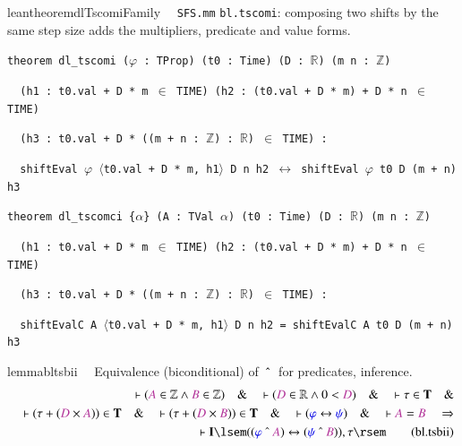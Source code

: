 \begin{restatable}{leantheorem}{dlTscomiFamily}~~ \texttt{SFS.mm} \texttt{bl.tscomi}: composing two shifts by the same step size adds the multipliers, predicate and value forms.

\texttt{\textcolor{leancolor}{theorem} \textcolor{leanyellow}{dl\_tscomi} ($\varphi$ : TProp) (t0 : Time) (D : $\mathbb{R}$) (m n : $\mathbb{Z}$)}

\texttt{~~(h1 : t0.val + D * m $\in$ TIME) (h2 : (t0.val + D * m) + D * n $\in$ TIME)}

\texttt{~~(h3 : t0.val + D * ((m + n : $\mathbb{Z}$) : $\mathbb{R}$) $\in$ TIME) :}

\texttt{~~shiftEval $\varphi$ $\langle$t0.val + D * m, h1$\rangle$ D n h2 $\leftrightarrow$ shiftEval $\varphi$ t0 D (m + n) h3}

\texttt{\textcolor{leancolor}{theorem} \textcolor{leanyellow}{dl\_tscomci} \{$\alpha$\} (A : TVal $\alpha$) (t0 : Time) (D : $\mathbb{R}$) (m n : $\mathbb{Z}$)}

\texttt{~~(h1 : t0.val + D * m $\in$ TIME) (h2 : (t0.val + D * m) + D * n $\in$ TIME)}

\texttt{~~(h3 : t0.val + D * ((m + n : $\mathbb{Z}$) : $\mathbb{R}$) $\in$ TIME) :}

\texttt{~~shiftEvalC A $\langle$t0.val + D * m, h1$\rangle$ D n h2 = shiftEvalC A t0 D (m + n) h3}
\label{dl_tscomi}
\label{dl_tscomci}
\end{restatable}

\begin{restatable}{lemma}{bltsbii}~~ Equivalence (biconditional) of
$~\string^~$ for predicates, inference.
\begin{align}
\vdash ( \mc{A} \in \mathbb{Z} \wedge \mc{B} \in \mathbb{Z} )\quad\&\quad
    \vdash ( \mc{D} \in \mathbb{R} \wedge 0 < \mc{D} )\quad\&\quad \vdash \tau
    \in \mathbf{T}\quad\& \notag \\ %
      \quad \vdash ( \tau + ( \mc{D} \times \mc{A} ) ) \in
    \mathbf{T}\quad\&\quad \vdash ( \tau + ( \mc{D} \times \mc{B} ) ) \in
    \mathbf{T}\quad\&\quad \vdash ( \mw{\varphi} \leftrightarrow \mw{\psi}
    )\quad\&\quad \vdash \mc{A} = \mc{B}\quad\Rightarrow \notag \\ %
      \quad \vdash \mathbf{I}
    \lsem ( ( \mw{\varphi} ~\string^~ \mc{A} ) \leftrightarrow ( \mw{\psi}
    ~\string^~ \mc{B} ) ) , \tau \rsem\label{eq:bl.tsbii}\tag{bl.tsbii}
\end{align}
\end{restatable}

